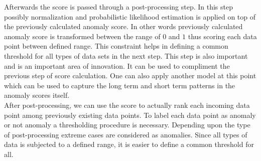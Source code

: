 \documentclass[12pt]{article}
\begin{document}
\break
Afterwards the score is passed through a post-processing step. In this step possibly normalization and probabilistic likelihood estimation is applied on top of the previously calculated anomaly score. In other words previously calculated anomaly score is transformed between the range of $0$ and $1$ thus scoring each data point between defined range. This constraint helps in defining a common threshold for all types of data sets in the next step. This step is also important and is an important area of innovation. It can be used to compliment the previous step of score calculation. One can also apply another model at this point which can be used to capture the long term and short term patterns in the anomaly scores itself.\\
\break
After post-processing, we can use the score to actually rank each incoming data point among previously existing data points. To label each data point as anomaly or not anomaly a thresholding procedure is necessary. Depending upon the type of post-processing extreme cases are considered as anomalies. Since all types of data is subjected to a defined range, it is easier to define a common threshold for all.
\end{document}
